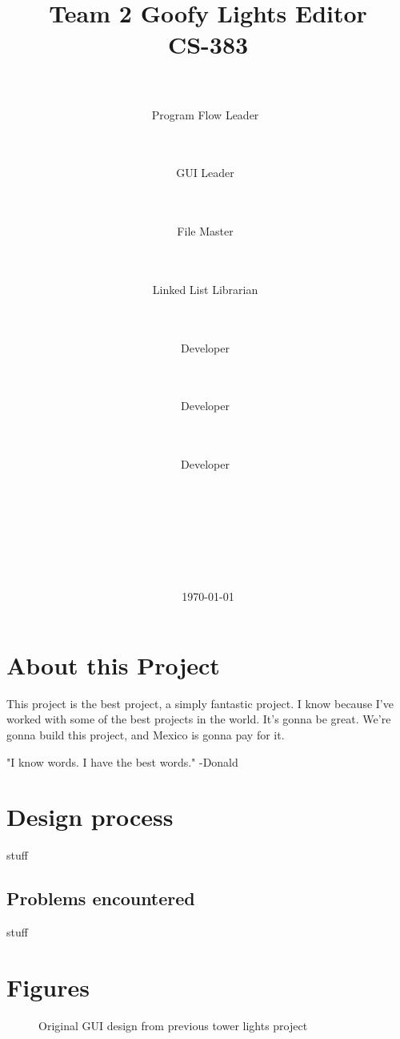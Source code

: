 \documentclass[11pt]{article} %
\title{
	{\Huge Team 2 Goofy Lights Editor}
	\\
	{\Large CS-383}}
\author{
	\\
	\makebox[.3\linewidth]{Nick Krenowicz}\\Program Flow Leader\ \and
	\\
	\makebox[.3\linewidth]{Paul Martin}\\GUI Leader\ \and
	\\
	\makebox[.3\linewidth]{Tim Sonnen}\\File Master\ \and
	\\
	\makebox[.3\linewidth]{Kevin Dorscher}\\Linked List Librarian\ \and
	\\
	\makebox[.3\linewidth]{Joe Carter}\\Developer\ \and
	\\
	\makebox[.3\linewidth]{Lise Welch}\\Developer\ \and
	\\
	\makebox[.3\linewidth]{Emma Bateman}\\Developer\ \and
	\\
	\makebox[.3\linewidth]{}\\ \ %
	\\
	\\
	\\
	\\}
\date{\today} %
\begin{document}
\lstset{language=C++}
\maketitle
\pagebreak

\tableofcontents

\section{About this Project}
This project is the best project, a simply fantastic project. I know because I've worked with some of the best projects in the world. It's gonna be great. We're gonna build this project, and Mexico is gonna pay for it.

"I know words. I have the best words." -Donald

\section{Design process}
stuff

\subsection{Problems encountered}
stuff


\newpage
\section{Figures}
  
  \begin{figure}[H]
  	\centering
  	\caption{Original GUI design from previous tower lights project}
  	\label{fig:GUI Base Design Reference}
  \end{figure}
  
\end{document}

